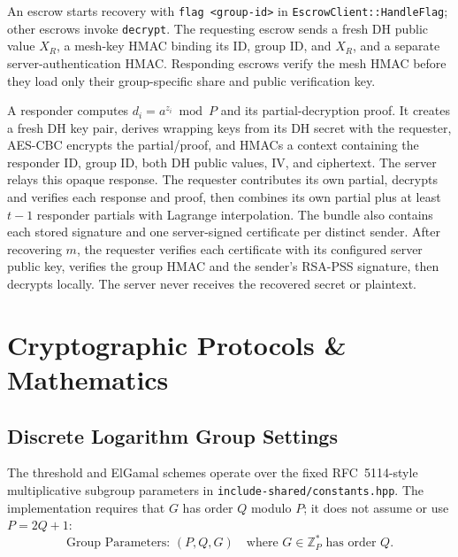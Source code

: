 \documentclass[11pt,a4paper]{article}
\begin{document}
An escrow starts recovery with \texttt{flag <group-id>} in \texttt{EscrowClient::HandleFlag}; other escrows invoke \texttt{decrypt}. The requesting escrow sends a fresh DH public value $X_R$, a mesh-key HMAC binding its ID, group ID, and $X_R$, and a separate server-authentication HMAC. Responding escrows verify the mesh HMAC before they load only their group-specific share and public verification key.

A responder computes $d_i=a^{z_i}\bmod P$ and its partial-decryption proof. It creates a fresh DH key pair, derives wrapping keys from its DH secret with the requester, AES-CBC encrypts the partial/proof, and HMACs a context containing the responder ID, group ID, both DH public values, IV, and ciphertext. The server relays this opaque response. The requester contributes its own partial, decrypts and verifies each response and proof, then combines its own partial plus at least $t-1$ responder partials with Lagrange interpolation. The bundle also contains each stored signature and one server-signed certificate per distinct sender. After recovering $m$, the requester verifies each certificate with its configured server public key, verifies the group HMAC and the sender's RSA-PSS signature, then decrypts locally. The server never receives the recovered secret or plaintext.

\section{Cryptographic Protocols \& Mathematics}
\label{sec:crypto_math}

\subsection{Discrete Logarithm Group Settings}
The threshold and ElGamal schemes operate over the fixed RFC~5114-style multiplicative subgroup parameters in \texttt{include-shared/constants.hpp}.  The implementation requires that $G$ has order $Q$ modulo $P$; it does not assume or use $P=2Q+1$:
\[
	\text{Group Parameters: } (P, Q, G) \quad \text{where } G \in \mathbb{Z}_P^* \text{ has order } Q.
\]
\end{document}

